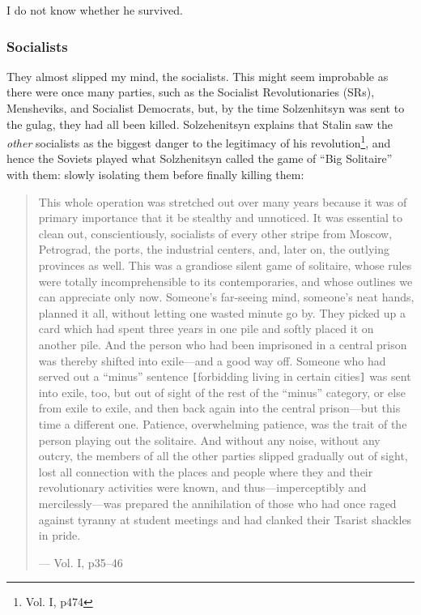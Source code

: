\documentclass{article}
\begin{document}
I do not know whether he survived.

\subsubsection{Socialists}

They almost slipped my mind, the socialists.  This might seem improbable as there were once many parties, such as the Socialist Revolutionaries (SRs), Mensheviks, and Socialist Democrats, but, by the time Solzenhitsyn was sent to the gulag, they had all been killed.  Solzehenitsyn explains that Stalin saw the \emph{other} socialists as the biggest danger to the legitimacy of his revolution\footnote{Vol. I, p474}, and hence the Soviets played what Solzhenitsyn called the game of ``Big Solitaire'' with them: slowly isolating them before finally killing them:

\begin{quote}
This whole operation was stretched out over many years because it was of primary importance that it be stealthy and unnoticed.  It was essential to clean out, conscientiously, socialists of every other stripe from Moscow, Petrograd, the ports, the industrial centers, and, later on, the outlying provinces as well.  This was a grandiose silent game of solitaire, whose rules were totally incomprehensible to its contemporaries, and whose outlines we can appreciate only now.  Someone's far-seeing mind, someone's neat hands, planned it all, without letting one wasted minute go by.  They picked up a card which had spent three years in one pile and softly placed it on another pile.  And the person who had been imprisoned in a central prison was thereby shifted into exile---and a good way off.  Someone who had served out a ``minus'' sentence \verb|[|forbidding living in certain cities\verb|]| was sent into exile, too, but out of sight of the rest of the ``minus'' category, or else from exile to exile, and then back again into the central prison---but this time a different one.  Patience, overwhelming patience, was the trait of the person playing out the solitaire.  And without any noise, without any outcry, the members of all the other parties slipped gradually out of sight, lost all connection with the places and people where they and their revolutionary activities were known, and thus---imperceptibly and mercilessly---was prepared the annihilation of those who had once raged against tyranny at student meetings and had clanked their Tsarist shackles in pride.

--- Vol. I, p35--46
\end{quote}
\end{document}
